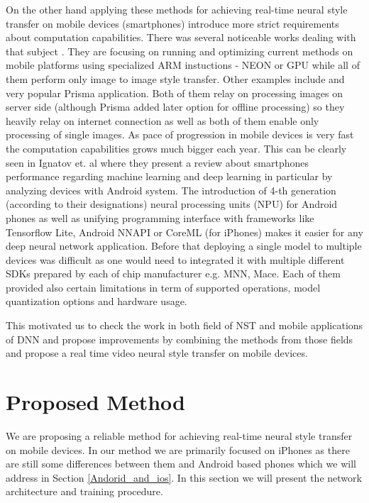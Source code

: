 \documentclass[a4paper,conference]{IEEEtran}
\begin{document}
On the other hand applying these methods for achieving real-time neural style transfer on mobile devices (smartphones) introduce more strict requirements about computation capabilities. There was several noticeable works dealing with that subject \cite{TinyTransformer,iosApp,Pictory}. They are focusing on running and optimizing current methods on mobile platforms using specialized ARM instuctions - NEON or  GPU while all of them perform only image to image style transfer.
Other examples include \cite{Novecento} and very popular Prisma application. Both of them relay on processing images on server side (although Prisma added later option for offline processing) so they heavily relay on internet connection as well as both of them enable only processing of single images. As pace of progression in mobile devices is very fast the computation capabilities grows much bigger each year. This can be clearly seen in Ignatov et. al\cite{aiMobileBenchmark} where they present a review about smartphones performance regarding machine learning and deep learning in particular by analyzing devices with Android system. The introduction of 4-th generation (according to their designations) neural processing units (NPU) for Android phones as well as unifying programming interface with frameworks like Tensorflow Lite, Android NNAPI or CoreML (for iPhones) makes it easier for any deep neural network application. Before that deploying a single model to multiple devices was difficult as one would need to integrated it with multiple different SDKs prepared by each of chip manufacturer e.g. MNN, Mace. Each of them provided also certain limitations in term of supported operations, model quantization options and hardware usage.

This motivated us to check the work in both field of NST and mobile applications of DNN and propose improvements by combining the methods from those fields and propose a real time video neural style transfer on mobile devices.


 
\section{Proposed Method}

We are proposing a reliable method for achieving real-time neural style transfer on mobile devices. In our method we are primarily focused on iPhones as there are still some differences between them and Android based phones which we will address in Section \ref{Andorid_and_ios}. In this section we will present the network architecture and training procedure. 
\end{document}
